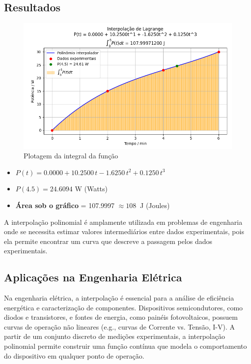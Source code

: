 \documentclass{article}
\begin{document}
\subsection*{Resultados}
\begin{figure}[H]
        \centering
        \includegraphics[width=1.0\textwidth, height=0.4\textheight, keepaspectratio]{Q2_resultados.png}
        \caption{Plotagem da integral da função}\label{fig:Q2_resultado}
\end{figure}

\begin{itemize}
    \item $P(t) = 0.0000 + 10.2500\,t - 1.6250\,t^2 + 0.1250\,t^3$
    \item $P(4.5) = 24.6094$ W (Watts)
    \item \textbf{Área sob o gráfico} = 107.9997 $\approx 108\ $ J (Joules)
\end{itemize}

A interpolação polinomial é amplamente utilizada em problemas de engenharia onde se necessita estimar valores intermediários entre dados experimentais, pois ela permite encontrar um curva que descreve a passagem pelos dados experimentais.

\subsection*{Aplicações na Engenharia Elétrica}
\justifying
Na engenharia elétrica, a interpolação é essencial para a análise de eficiência energética e caracterização de componentes. Dispositivos semicondutores, como diodos e transistores, e fontes de energia, como painéis fotovoltaicos, possuem curvas de operação não lineares 
(e.g., curvas de Corrente vs. Tensão, I-V). A partir de um conjunto discreto de medições experimentais, a interpolação polinomial permite construir uma função contínua que modela o comportamento do dispositivo em qualquer ponto de operação.
\end{document}
